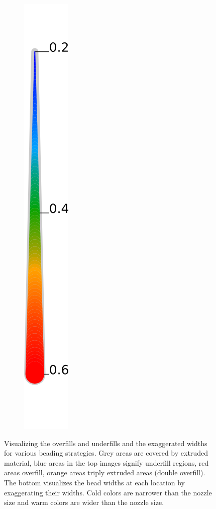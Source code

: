 \begin{figure}
\begin{subfigure}{.04\columnwidth}
\includegraphics[height=\figheight]{sources/validation/gMAT_example/widths_legend.png}
\end{subfigure}
\caption{
Visualizing the overfills and underfills and the exaggerated widths for various beading strategies.
Grey areas are covered by extruded material,
blue areas in the top images signify underfill regions,
red areas overfill,
orange areas triply extruded areas (double overfill).
The bottom visualizes the bead widths at each location by exaggerating their widths.
Cold colors are narrower than the nozzle size and warm colors are wider than the nozzle size.
}
\label{visualized_accuracy}
\end{figure}




